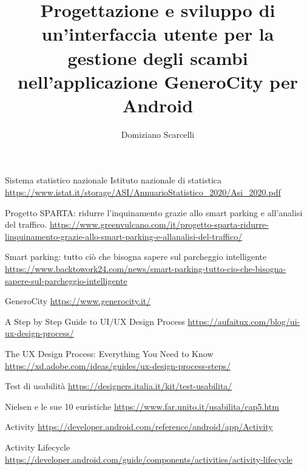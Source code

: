 \documentclass[noexaminfo, Lau, oneside]{sapthesis}
\title{Progettazione e sviluppo di un'interfaccia utente per la gestione degli scambi nell'applicazione GeneroCity per Android}
\author{Domiziano Scarcelli}
\begin{document}
\maketitle


\tableofcontents

\mainmatter







\backmatter
{}
\begin{thebibliography}{17}

Sistema statistico nazionale Istituto nazionale di statistica 
\url{https://www.istat.it/storage/ASI/AnnuarioStatistico_2020/Asi_2020.pdf}

Progetto SPARTA: ridurre l'inquinamento grazie allo smart parking e all'analisi del traffico.
\url{https://www.greenvulcano.com/it/progetto-sparta-ridurre-linquinamento-grazie-allo-smart-parking-e-allanalisi-del-traffico/}

Smart parking: tutto ciò che bisogna sapere sul parcheggio intelligente
\url{https://www.backtowork24.com/news/smart-parking-tutto-cio-che-bisogna-sapere-sul-parcheggio-intelligente}

GeneroCity \url{https://www.generocity.it/}

A Step by Step Guide to UI/UX Design Process \url{https://aufaitux.com/blog/ui-ux-design-process/}

The UX Design Process: Everything You Need to Know \url{https://xd.adobe.com/ideas/guides/ux-design-process-steps/}

Test di usabilità
\url{https://designers.italia.it/kit/test-usabilita/}

Nielsen e le sue 10 euristiche
\url{https://www.far.unito.it/usabilita/cap5.htm}

Activity
\url{https://developer.android.com/reference/android/app/Activity}

Activity Lifecycle
\url{https://developer.android.com/guide/components/activities/activity-lifecycle}


\end{thebibliography}
\end{document}
